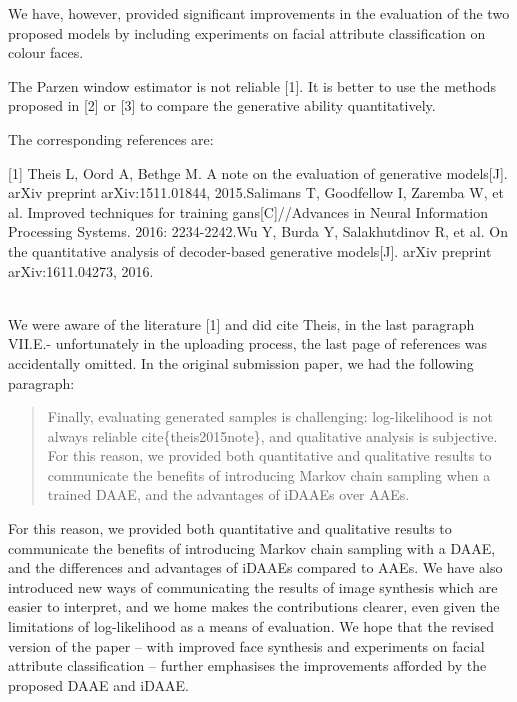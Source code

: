 \documentclass{article}
\begin{document}
We have, however, provided significant improvements in the evaluation of the two proposed models by including experiments on facial attribute classification on colour faces.


{\color{blue}
The Parzen window estimator is not reliable [1]. It is better to use the methods proposed in [2] or [3] to compare the generative ability quantitatively.

The corresponding references are:

[1] Theis L, Oord A, Bethge M. A note on the evaluation of generative models[J]. arXiv preprint arXiv:1511.01844, 2015.\newline
[2] Salimans T, Goodfellow I, Zaremba W, et al. Improved techniques for training gans[C]//Advances in Neural Information Processing Systems. 2016: 2234-2242.\newline
[3] Wu Y, Burda Y, Salakhutdinov R, et al. On the quantitative analysis of decoder-based generative models[J]. arXiv preprint arXiv:1611.04273, 2016.\newline
}
\\

We were aware of the literature [1] and did cite Theis, in the last paragraph VII.E.- unfortunately in the uploading process, the last page of references was accidentally omitted. In the original submission paper, we had the following paragraph:

\begin{quote} Finally, evaluating generated samples is challenging: log-likelihood is not always reliable cite\{theis2015note\}, and qualitative analysis is subjective. For this reason, we provided both quantitative and qualitative results to communicate the benefits of introducing Markov chain sampling when a trained DAAE, and the advantages of iDAAEs over AAEs. 
\end{quote}

For this reason, we provided both quantitative and qualitative results to communicate the benefits of introducing Markov chain sampling with a DAAE, and the differences and advantages of iDAAEs compared to AAEs. We have also introduced new ways of communicating the results of image synthesis which are easier to interpret, and we home makes the contributions clearer, even given the limitations of log-likelihood as a means of evaluation. We hope that the revised version of the paper -- with improved face synthesis and experiments on facial attribute classification -- further emphasises the improvements afforded by the proposed DAAE and iDAAE.\\
\end{document}
